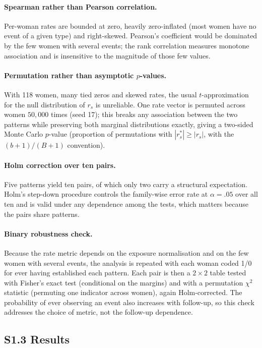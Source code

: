 \documentclass[12pt]{article}
\begin{document}
\paragraph{Spearman rather than Pearson correlation.} Per-woman rates are bounded at
zero, heavily zero-inflated (most women have no event of a given type) and right-skewed.
Pearson's coefficient would be dominated by the few women with several events; the rank
correlation measures monotone association and is insensitive to the magnitude of those
few values.

\paragraph{Permutation rather than asymptotic $p$-values.} With 118 women, many tied zeros
and skewed rates, the usual $t$-approximation for the null distribution of $r_s$ is
unreliable. One rate vector is permuted across women $50{,}000$ times (seed 17); this
breaks any association between the two patterns while preserving both marginal
distributions exactly, giving a two-sided Monte Carlo $p$-value (proportion of permutations
with $|r_s^*| \geq |r_s|$, with the $(b+1)/(B+1)$ convention).

\paragraph{Holm correction over ten pairs.} Five patterns yield ten pairs, of which only
two carry a structural expectation. Holm's step-down procedure controls the family-wise
error rate at $\alpha = .05$ over all ten and is valid under any dependence among the
tests, which matters because the pairs share patterns.

\paragraph{Binary robustness check.} Because the rate metric depends on the exposure
normalisation and on the few women with several events, the analysis is repeated with
each woman coded 1/0 for ever having established each pattern. Each pair is then a
$2 \times 2$ table tested with Fisher's exact test (conditional on the margins) and with a
permutation $\chi^2$ statistic (permuting one indicator across women), again
Holm-corrected. The probability of ever observing an event also increases with follow-up,
so this check addresses the choice of metric, not the follow-up dependence.

\subsection*{S1.3 Results}
\end{document}
